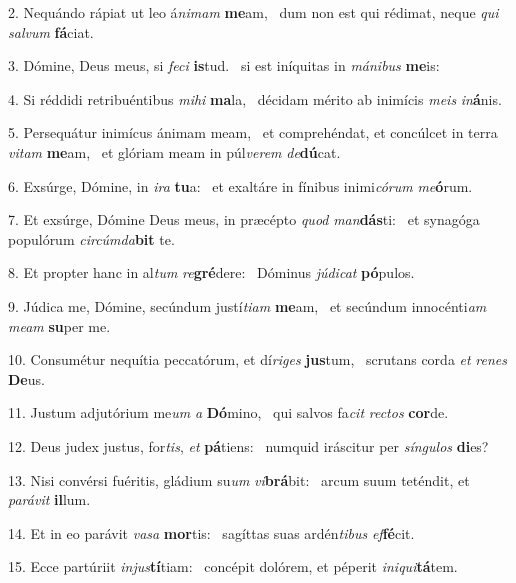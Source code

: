 2. Nequándo rápiat ut leo á\textit{ni}\textit{mam} \textbf{me}am, \ast\  dum non est qui rédimat, neque \textit{qui} \textit{sal}\textit{vum} \textbf{fá}ciat.\

3. Dómine, Deus meus, si \textit{fe}\textit{ci} \textbf{is}tud. \ast\  si est iníquitas in \textit{má}\textit{ni}\textit{bus} \textbf{me}is:\

4. Si réddidi retribuéntibus \textit{mi}\textit{hi} \textbf{ma}la, \ast\  décidam mérito ab inimícis \textit{me}\textit{is} \textit{in}\textbf{á}nis.\

5. Persequátur inimícus ánimam meam, \dag\  et comprehéndat, et concúlcet in terra \textit{vi}\textit{tam} \textbf{me}am, \ast\  et glóriam meam in púl\textit{ve}\textit{rem} \textit{de}\textbf{dú}cat.\

6. Exsúrge, Dómine, in \textit{i}\textit{ra} \textbf{tu}a: \ast\  et exaltáre in fínibus inimi\textit{có}\textit{rum} \textit{me}\textbf{ó}rum.\

7. Et exsúrge, Dómine Deus meus, in præcépto \textit{quod} \textit{man}\textbf{dás}ti: \ast\  et synagóga populórum \textit{cir}\textit{cúm}\textit{da}\textbf{bit} te.\

8. Et propter hanc in al\textit{tum} \textit{re}\textbf{gré}dere: \ast\  Dóminus \textit{jú}\textit{di}\textit{cat} \textbf{pó}pulos.\

9. Júdica me, Dómine, secúndum justí\textit{ti}\textit{am} \textbf{me}am, \ast\  et secúndum innocénti\textit{am} \textit{me}\textit{am} \textbf{su}per me.\

10. Consumétur nequítia peccatórum, et dí\textit{ri}\textit{ges} \textbf{jus}tum, \ast\  scrutans corda \textit{et} \textit{re}\textit{nes} \textbf{De}us.\

11. Justum adjutórium me\textit{um} \textit{a} \textbf{Dó}mino, \ast\  qui salvos fa\textit{cit} \textit{rec}\textit{tos} \textbf{cor}de.\

12. Deus judex justus, for\textit{tis}, \textit{et} \textbf{pá}tiens: \ast\  numquid iráscitur per \textit{sín}\textit{gu}\textit{los} \textbf{di}es?\

13. Nisi convérsi fuéritis, gládium su\textit{um} \textit{vi}\textbf{brá}bit: \ast\  arcum suum teténdit, et \textit{pa}\textit{rá}\textit{vit} \textbf{il}lum.\

14. Et in eo parávit \textit{va}\textit{sa} \textbf{mor}tis: \ast\  sagíttas suas ardén\textit{ti}\textit{bus} \textit{ef}\textbf{fé}cit.\

15. Ecce partúriit \textit{in}\textit{jus}\textbf{tí}tiam: \ast\  concépit dolórem, et péperit \textit{in}\textit{i}\textit{qui}\textbf{tá}tem.\

